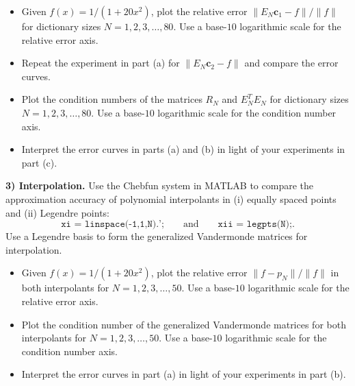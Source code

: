 \documentclass[12pt]{article}
\begin{document}
\begin{itemize}

	\item[\textbf{(a)}] Given $f(x) = 1/(1+20x^2)$, plot the relative error $\|E_N\mathbf{c}_1-f\|/\|f\|$ for dictionary sizes $N=1,2,3,\ldots,80$. Use a base-$10$ logarithmic scale for the relative error axis. 
    
	\item[\textbf{(b)}] Repeat the experiment in part (a) for $\|E_N\mathbf{c}_2-f\|$ and compare the error curves. 

	\item[\textbf{(c)}] Plot the condition numbers of the matrices $R_N$ and $E_N^TE_N$ for dictionary sizes $N=1,2,3,\ldots,80$. Use a base-$10$ logarithmic scale for the condition number axis. 

	\item[\textbf{(d)}] Interpret the error curves in parts (a) and (b) in light of your experiments in part (c).

\end{itemize} 

\bigskip

\noindent
\textbf{3) Interpolation.} Use the Chebfun system in MATLAB to compare the approximation accuracy of polynomial interpolants in (i) equally spaced points and (ii) Legendre points:
$$
\texttt{xi = linspace(-1,1,N).';} \qquad \text{and} \qquad \texttt{xii = legpts(N);}.
$$
Use a Legendre basis to form the generalized Vandermonde matrices for interpolation.

\begin{itemize}

	\item[\textbf{(a)}]  Given $f(x) = 1/(1+20x^2)$, plot the relative error $\|f-p_N\|/\|f\|$ in both interpolants for $N=1,2,3,\ldots,50$. Use a base-$10$ logarithmic scale for the relative error axis.

	\item[\textbf{(b)}] Plot the condition number of the generalized Vandermonde matrices for both interpolants for $N=1,2,3,\ldots,50$. Use a base-$10$ logarithmic scale for the condition number axis.

	\item[\textbf{(c)}] Interpret the error curves in part (a) in light of your experiments in part (b).

\end{itemize} 
\end{document}
